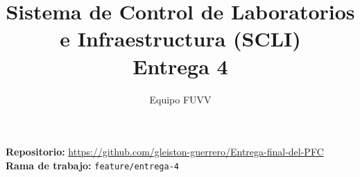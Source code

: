\documentclass[12pt,a4paper]{article}
\title{Sistema de Control de Laboratorios e Infraestructura (SCLI)\\Entrega 4}
\author{Equipo FUVV}
\date{}
\begin{document}
\maketitle
\begin{center}
  \textbf{Repositorio:} \url{https://github.com/gleiston-guerrero/Entrega-final-del-PFC}\\
  \textbf{Rama de trabajo:} \texttt{feature/entrega-4}
\end{center}
\tableofcontents
\newpage








\end{document}
